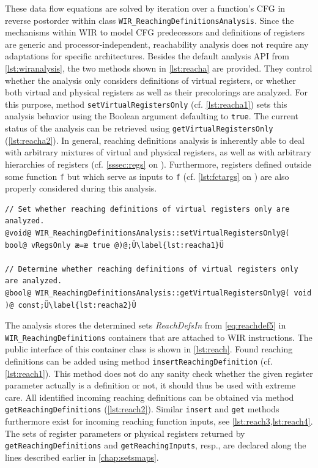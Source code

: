 These data flow equations are solved by iteration over a function's \gls{CFG} in reverse postorder within class \texttt{WIR\_\-ReachingDefinitionsAnalysis}.
Since the mechanisms within \gls{WIR} to model \gls{CFG} predecessors and definitions of registers are generic and processor-independent, reachability analysis does not require any adaptations for specific architectures.
Besides the default analysis \gls{API} from \cref{lst:wiranalysis}, the two methods shown in \cref{lst:reacha} are provided.
They control whether the analysis only considers definitions of virtual registers, or whether both virtual and physical registers as well as their precolorings are analyzed.
For this purpose, method \texttt{setVirtualRegistersOnly} (cf. \cref{lst:reacha1}) sets this analysis behavior using the Boolean argument defaulting to \texttt{true}.
The current status of the analysis can be retrieved using \texttt{getVirtualRegistersOnly} (\cref{lst:reacha2}).
In general, reaching definitions analysis is inherently able to deal with arbitrary mixtures of virtual and physical registers, as well as with arbitrary hierarchies of registers (cf. \cref{sssec:regs} on ).
Furthermore, registers defined outside some function \texttt{f} but which serve as inputs to \texttt{f} (cf. \cref{lst:fctargs} on ) are also properly considered during this analysis.

\begin{lstlisting}[style=code,float=t,caption={Public Interface of Class \texttt{WIR\_ReachingDefinitionsAnalysis}},label=lst:reacha]
// Set whether reaching definitions of virtual registers only are analyzed.
@void@ WIR_ReachingDefinitionsAnalysis::setVirtualRegistersOnly@( bool@ vRegsOnly æ=æ true @)@;Ü\label{lst:reacha1}Ü

// Determine whether reaching definitions of virtual registers only are analyzed.
@bool@ WIR_ReachingDefinitionsAnalysis::getVirtualRegistersOnly@( void )@ const;Ü\label{lst:reacha2}Ü
\end{lstlisting}

The analysis stores the determined sets \textit{ReachDefsIn} from \cref{eq:reachdef5} in \texttt{WIR\_ReachingDefinitions} containers that are attached to \gls{WIR} instructions.
The public interface of this container class is shown in \cref{lst:reach}.
Found reaching definitions can be added using method \texttt{insertReachingDefinition} (cf. \cref{lst:reach1}).
This method does not do any sanity check whether the given register parameter actually is a definition or not, it should thus be used with extreme care.
All identified incoming reaching definitions can be obtained via method \texttt{getReachingDefinitions} (\cref{lst:reach2}).
Similar \texttt{insert} and \texttt{get} methods furthermore exist for incoming reaching function inputs, see \cref{lst:reach3,lst:reach4}.
The sets of register parameters or physical registers returned by \texttt{getReachingDefinitions} and \texttt{getReachingInputs}, resp., are declared along the lines described earlier in \cref{chap:setsmaps}.

